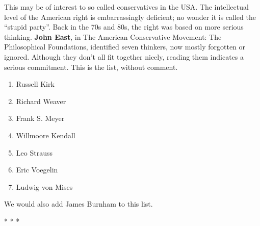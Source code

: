 This may be of interest to so called conservatives in the USA. The intellectual level of the American right is embarrassingly deficient; no wonder it is called the ``stupid party''. Back in the 70s and 80s, the right was based on more serious thinking. \textbf{John East}, in The American Conservative Movement: The Philosophical Foundations, identified seven thinkers, now mostly forgotten or ignored. Although they don't all fit together nicely, reading them indicates a serious commitment. This is the list, without comment.

\begin{enumerate}
\item Russell Kirk
\item Richard Weaver
\item Frank S. Meyer
\item Willmoore Kendall
\item Leo Strauss
\item Eric Voegelin
\item Ludwig von Mises
\end{enumerate}


We would also add James Burnham to this list.



\begin{center}* * *\end{center}

